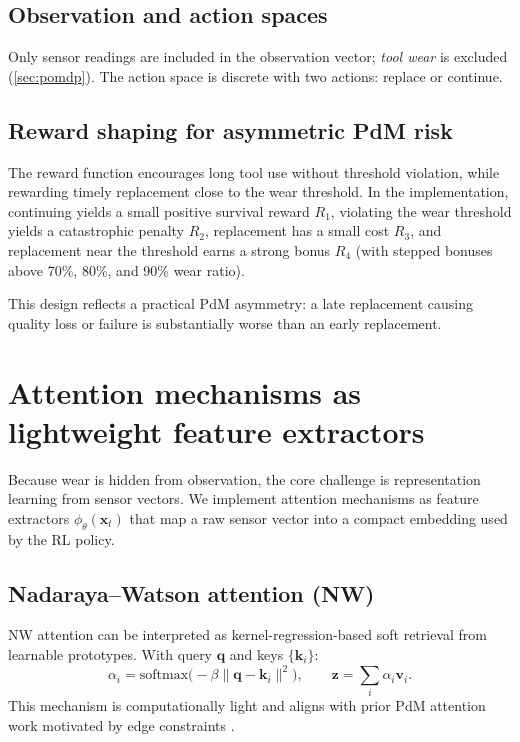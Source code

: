 \documentclass[11pt]{article}
\begin{document}
\subsection{Observation and action spaces}
Only sensor readings are included in the observation vector; \emph{tool wear} is excluded (\cref{sec:pomdp}). The action space is discrete with two actions: replace or continue.

\subsection{Reward shaping for asymmetric PdM risk}
\label{sec:reward}
The reward function encourages long tool use without threshold violation, while rewarding timely replacement close to the wear threshold. In the implementation, continuing yields a small positive survival reward $R_1$, violating the wear threshold yields a catastrophic penalty $R_2$, replacement has a small cost $R_3$, and replacement near the threshold earns a strong bonus $R_4$ (with stepped bonuses above 70\%, 80\%, and 90\% wear ratio).

This design reflects a practical PdM asymmetry: a late replacement causing quality loss or failure is substantially worse than an early replacement.

\section{Attention mechanisms as lightweight feature extractors}
\label{sec:attention}
Because wear is hidden from observation, the core challenge is representation learning from sensor vectors. We implement attention mechanisms as feature extractors $\phi_\theta(\mathbf{x}_t)$ that map a raw sensor vector into a compact embedding used by the RL policy.

\subsection{Nadaraya--Watson attention (NW)}
NW attention can be interpreted as kernel-regression-based soft retrieval from learnable prototypes. With query $\mathbf{q}$ and keys $\{\mathbf{k}_i\}$:
\begin{equation}
	\alpha_i = \mathrm{softmax}\big(-\beta \lVert \mathbf{q}-\mathbf{k}_i\rVert^2\big),\qquad
	\mathbf{z}=\sum_i \alpha_i \mathbf{v}_i.
\end{equation}
This mechanism is computationally light and aligns with prior PdM attention work motivated by edge constraints \parencite{Siraskar2024NWAttention}.
\end{document}
